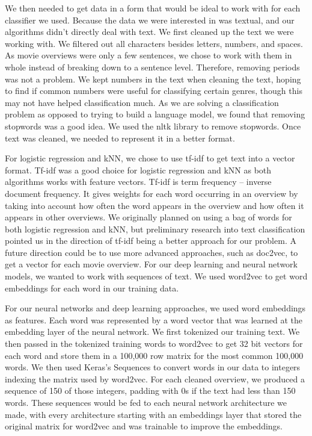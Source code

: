 \documentclass[sigconf]{acmart}
\begin{document}
We then needed to get data in a form that would be ideal to work with for each classifier we used.  Because the data we were interested in was textual, and our algorithms didn't directly deal with text. We first cleaned up the text we were working with.  We filtered out all characters besides letters, numbers, and spaces. As movie overviews were only a few sentences, we chose to work with them in whole instead of breaking down to a sentence level. Therefore, removing periods was not a problem.  We kept numbers in the text when cleaning the text, hoping to find if common numbers were useful for classifying certain genres, though this may not have helped classification much.  As we are solving a classification problem as opposed to trying to build a language model, we found that removing stopwords was a good idea. We used the nltk library to remove stopwords. Once text was cleaned, we needed to represent it in a better format. 

For logistic regression and kNN, we chose to use tf-idf to get text into a vector format. Tf-idf was a good choice for logistic regression and kNN as both algorithms works with feature vectors. 
Tf-idf is term frequency -- inverse document frequency.  It gives weights for each word occurring in an overview by taking into account how often the word appears in the overview and how often it appears in other overviews. We originally planned on using a bag of words for both logistic regression and kNN, but preliminary research into text classification pointed us in the direction of tf-idf being a better approach for our problem.  A future direction could be to use more advanced approaches, such as doc2vec, to get a vector for each movie overview.  
For our deep learning and neural network models, we wanted to work with sequences of text.  We used word2vec to get word embeddings for each word in our training data.

For our neural networks and deep learning approaches, we used word embeddings as features.  Each word was represented by a word vector that was learned at the embedding layer of the neural network.  We first tokenized our training text. We then passed in the tokenized training words to word2vec to get 32 bit vectors for each word and store them in a 100,000 row matrix for the most common 100,000 words.  We then used Keras's Sequences to convert words in our data to integers indexing the matrix used by word2vec.  For each cleaned overview, we produced a sequence of 150 of those integers, padding with 0s if the text had less than 150 words. These sequences would be fed to each neural network architecture we made, with every architecture starting with an embeddings layer that stored the original matrix for word2vec and was trainable to improve the embeddings. 
\end{document}
